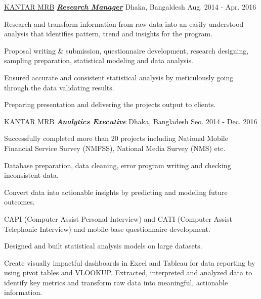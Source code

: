 \begin{cventries}
  \cventry
    {\href{http://www.kantar.com/}{KANTAR MRB}} %
   {\href{https://www.dropbox.com/sh/bg88dnmjpcicdmn/AACdPh__4UdzmbZgx1FtOz3sa?dl=0}{\textbf {\textit {Research Manager}}}} %
    {Dhaka, Bangaldesh} %
    {Aug. 2014 - Apr. 2016} %
    {
      \begin{cvitems} %
	\item{Research and transform information from raw data into an easily understood analysis that identifies pattern, trend and insights for the program.}
	\item{Proposal writing \& submission, questionnaire development, research designing, sampling preparation, statistical modeling and data analysis.}
	\item{Ensured accurate and consistent statistical analysis by meticulously going through the data validating results.}
	\item{Preparing presentation and delivering the projects output to clients.}
      \end{cvitems}
    }

  \cventry
    {\href{http://www.kantar.com/}{KANTAR MRB}} %
   {\href{https://www.dropbox.com/sh/bg88dnmjpcicdmn/AACdPh__4UdzmbZgx1FtOz3sa?dl=0}{\textbf {\textit {Analytics Executive}}}} %
    {Dhaka, Bangladesh} %
    {Seo. 2014 - Dec. 2016} %
    {
      \begin{cvitems} %
\item{Successfully completed more than 20 projects including National Mobile Financial Service Survey (NMFSS), National Media Survey (NMS) etc.}
\item{Database preparation, data cleaning, error program writing and checking inconsistent data.}
\item{Convert data into actionable insights by predicting and modeling future outcomes.}
\item{CAPI (Computer Assist Personal Interview) and CATI (Computer Assist Telephonic Interview) and mobile base questionnaire development.}
\item{Designed and built statistical analysis models on large datasets.}
\item {Create visually impactful dashboards in Excel and Tableau for data reporting by using pivot tables and VLOOKUP. Extracted, interpreted and analyzed data to identify key metrics and transform raw data into meaningful, actionable information.}
      \end{cvitems}
    }


\end{cventries}
